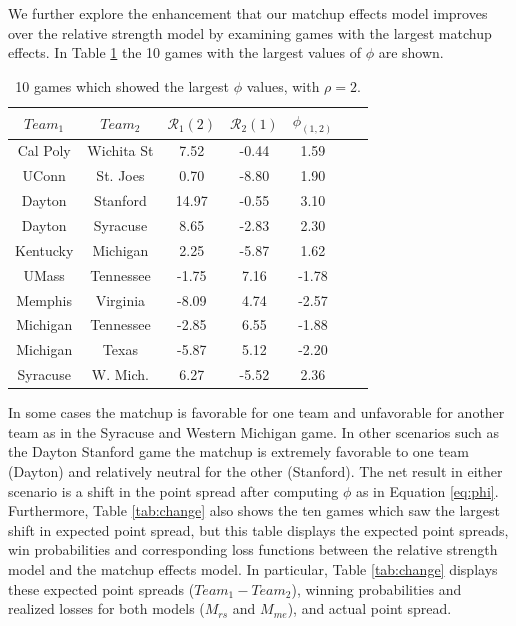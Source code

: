 \documentclass[letterpaper,12pt]{article}
\begin{document}
We further explore the enhancement that our matchup effects model improves over the relative strength model by examining games with the largest matchup effects. In Table \ref{tab:phi} the 10 games with the largest values of $\phi$ are shown. 
\begin{table}[h!]
\caption{10 games which showed the largest $\phi$ values, with $\rho=2$.\label{tab:phi}}
\small
\centering
\begin{tabular}{|cc | ccc |c|c|}
  \hline
  \hline
 $Team_1$ & $Team_2$ & $\mathcal{R}_1(2)$ & $\mathcal{R}_2(1)$ & $\phi_{(1,2)}$\\ 
  \hline
 Cal Poly & Wichita St & 7.52  & -0.44 & 1.59 \\ 
 UConn & St. Joes &0.70 & -8.80& 1.90 \\ 
 Dayton & Stanford & 14.97 & -0.55 & 3.10 \\ 
 Dayton & Syracuse & 8.65 & -2.83 & 2.30\\ 
 Kentucky & Michigan & 2.25 & -5.87 & 1.62 \\ 
 UMass & Tennessee &-1.75 & 7.16 & -1.78 \\ 
 Memphis & Virginia & -8.09 & 4.74 & -2.57 \\ 
 Michigan & Tennessee & -2.85 & 6.55 & -1.88 \\ 
 Michigan & Texas & -5.87 & 5.12 &-2.20\\ 
 Syracuse & W. Mich. & 6.27 & -5.52 & 2.36\\ 
   \hline
   \hline
\end{tabular}
\end{table}
In some cases the matchup is favorable for one team and unfavorable for another team as in the Syracuse and Western Michigan game. In other scenarios such as the Dayton Stanford game the matchup is extremely favorable to one team (Dayton) and relatively neutral for the other (Stanford). The net result in either scenario is a shift in the point spread after computing $\phi$ as in Equation \ref{eq:phi}.
Furthermore, Table \ref{tab:change} also shows the ten games which saw the largest shift in expected point spread, but this table displays the expected point spreads, win probabilities and corresponding loss functions between the relative strength model and the matchup effects model. In particular, Table \ref{tab:change} displays these expected point spreads ($Team_1 - Team_2$), winning probabilities and realized losses for both models ($M_{rs}$ and $M_{me}$), and actual point spread. 
\end{document}
